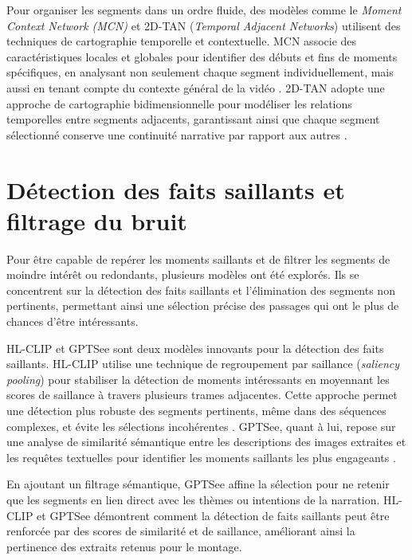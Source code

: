 Pour organiser les segments dans un ordre fluide, des modèles comme le \textit{Moment Context Network (MCN)} \cite{anonymous2017_localizing} et 2D-TAN (\textit{Temporal Adjacent Networks}) \cite{zhang2020_temporal} utilisent des techniques de cartographie temporelle et contextuelle. MCN associe des caractéristiques locales et globales pour identifier des débuts et fins de moments spécifiques, en analysant non seulement chaque segment individuellement, mais aussi en tenant compte du contexte général de la vidéo \cite{zhang2016_lstm}\cite{zhang2019_memory}. 2D-TAN adopte une approche de cartographie bidimensionnelle pour modéliser les relations temporelles entre segments adjacents, garantissant ainsi que chaque segment sélectionné conserve une continuité narrative par rapport aux autres \cite{prabhu2017_retrieval}\cite{zhang2020_temporal}.

\section{Détection des faits saillants et filtrage du bruit}

Pour être capable de repérer les moments saillants et de filtrer les segments de moindre intérêt ou redondants, plusieurs modèles ont été explorés. Ils se concentrent sur la détection des faits saillants et l’élimination des segments non pertinents, permettant ainsi une sélection précise des passages qui ont le plus de chances d’être intéressants. 

HL-CLIP \cite{han2024_clip} et GPTSee \cite{sun2023_gptsee} sont deux modèles innovants pour la détection des faits saillants. HL-CLIP utilise une technique de regroupement par saillance (\textit{saliency pooling}) pour stabiliser la détection de moments intéressants en moyennant les scores de saillance à travers plusieurs trames adjacentes. Cette approche permet une détection plus robuste des segments pertinents, même dans des séquences complexes, et évite les sélections incohérentes \cite{you2023_ferret}\cite{sun2023_gptsee}. GPTSee, quant à lui, repose sur une analyse de similarité sémantique entre les descriptions des images extraites et les requêtes textuelles pour identifier les moments saillants les plus engageants \cite{sun2023_gptsee}\cite{liu2022_umt}. 

En ajoutant un filtrage sémantique, GPTSee affine la sélection pour ne retenir que les segments en lien direct avec les thèmes ou intentions de la narration. HL-CLIP et GPTSee démontrent comment la détection de faits saillants peut être renforcée par des scores de similarité et de saillance, améliorant ainsi la pertinence des extraits retenus pour le montage. 

